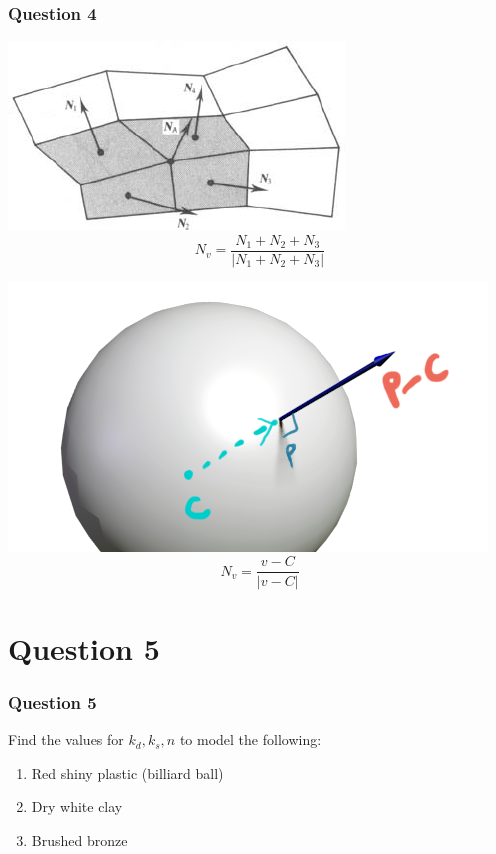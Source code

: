 \documentclass{beamer}
\begin{document}
\begin{frame}
    \frametitle{Question 4}


    \begin{center}
        \includegraphics[scale=0.3]{q4-normalvector0.png}
        \begin{equation*}
            N_v = \frac{N_1+ N_2 + N_3}{|N_1+ N_2 + N_3|}
        \end{equation*}

        \vspace{1em}

        \includegraphics[scale=0.3]{q4-normalvector1.png}
        \begin{equation*}
            N_v = \frac{v - C}{|v - C|}
        \end{equation*}
    \end{center}
    
\end{frame}

\section{Question 5}

\begin{frame}
    \frametitle{Question 5}

    Find the values for $k_d, k_s, n$ to model the following:

    \begin{enumerate}
        \item Red shiny plastic (billiard ball)
        \item Dry white clay
        \item Brushed bronze
    \end{enumerate}

\end{frame}
\end{document}
